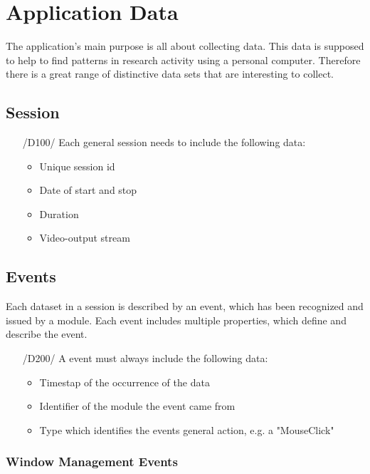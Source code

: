 \chapter{Application Data}
\label{ch:data}

The application's main purpose is all about collecting data. This data is supposed to help to find patterns in research activity using a personal computer. Therefore there is a great range of distinctive data sets that are interesting to collect.

\section{Session}
\begin{itemize}
\item[/D100/] Each general session needs to include the following data:
	\begin{itemize}
	\item Unique session id
	\item Date of start and stop
	\item Duration
	\item Video-output stream
	\end{itemize}
\end{itemize}

\section{Events}

Each dataset in a session is described by an event, which has been recognized and issued by a module. Each event includes multiple properties, which define and describe the event.

\begin{itemize}
\item[/D200/] A event must always include the following data:
	\begin{itemize}
	\item Timestap of the occurrence of the data
	\item Identifier of the module the event came from
	\item Type which identifies the events general action, e.g. a "MouseClick"
	\end{itemize}
\end{itemize}

\subsection{Window Management Events}

